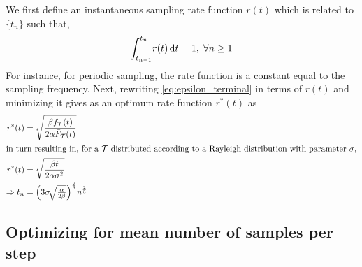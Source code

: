 We first define an instantaneous sampling rate function $r(t)$ which is related to $\{t_n\}$ such that,
\begin{alignat}{1}
{\int_{t_{n-1}}^{t_n}}r(t)\,\mathrm{d} t=1,\;\forall n\geq1\label{rt}
\end{alignat}
For instance, for periodic sampling, the rate function is a constant equal to the sampling frequency. 
Next, rewriting \cref{eq:epsilon_terminal} in terms of $r(t)$ and minimizing it gives as an optimum rate function $r^*(t)$ as
\begin{alignat}{1}
r^*(t)&=\sqrt{\dfrac{\beta f_\mathcal{T}(t)}{2\alpha\bar{F}_\mathcal{T}(t)}}\nonumber\\
\intertext{in turn resulting in, for a $\mathcal{T}$ distributed according to a Rayleigh distribution with parameter $\sigma$,}
r^*(t)&=\sqrt{\dfrac{\beta t}{2\alpha\sigma^2}}\nonumber\\
\Rightarrow t_n&=\Big(3\sigma\!\sqrt{\tfrac{\alpha}{2\beta}}\Big)^{\frac{2}{3}}n^{\frac{2}{3}}\label{tn_approx_rayleigh}
\end{alignat}


\subsection{Optimizing for mean number of samples per step}\label{ssec:optimization:samples}

